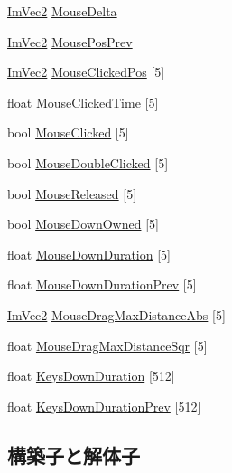 \begin{DoxyCompactItemize}
\item 
\mbox{\hyperlink{struct_im_vec2}{Im\+Vec2}} \mbox{\hyperlink{struct_im_gui_i_o_a5b5cc0c171104337e3e7e13a8f7b0938}{Mouse\+Delta}}
\item 
\mbox{\hyperlink{struct_im_vec2}{Im\+Vec2}} \mbox{\hyperlink{struct_im_gui_i_o_a0fa6601a709eb9e34460e6abc7e77ad7}{Mouse\+Pos\+Prev}}
\item 
\mbox{\hyperlink{struct_im_vec2}{Im\+Vec2}} \mbox{\hyperlink{struct_im_gui_i_o_a23c9c6c48a51774fee36b7f0bb75d331}{Mouse\+Clicked\+Pos}} \mbox{[}5\mbox{]}
\item 
float \mbox{\hyperlink{struct_im_gui_i_o_a729a9ddda54b9f7d7d640340d56e981b}{Mouse\+Clicked\+Time}} \mbox{[}5\mbox{]}
\item 
bool \mbox{\hyperlink{struct_im_gui_i_o_a8655587202ff9001e5b0ccc6ade42d93}{Mouse\+Clicked}} \mbox{[}5\mbox{]}
\item 
bool \mbox{\hyperlink{struct_im_gui_i_o_a8bc01048733dc554de3d03f40f57b9ca}{Mouse\+Double\+Clicked}} \mbox{[}5\mbox{]}
\item 
bool \mbox{\hyperlink{struct_im_gui_i_o_a3a2e7d52289eecfdbe8571e034e41b53}{Mouse\+Released}} \mbox{[}5\mbox{]}
\item 
bool \mbox{\hyperlink{struct_im_gui_i_o_a682f98d817f99058136cb47cf8a9bcc3}{Mouse\+Down\+Owned}} \mbox{[}5\mbox{]}
\item 
float \mbox{\hyperlink{struct_im_gui_i_o_ab464bf317051bbdf1c93ab36802fe3b7}{Mouse\+Down\+Duration}} \mbox{[}5\mbox{]}
\item 
float \mbox{\hyperlink{struct_im_gui_i_o_a59d19cf7ad831e57ce15f90295871881}{Mouse\+Down\+Duration\+Prev}} \mbox{[}5\mbox{]}
\item 
\mbox{\hyperlink{struct_im_vec2}{Im\+Vec2}} \mbox{\hyperlink{struct_im_gui_i_o_a402bca8838011fc4518c0895f24ffc92}{Mouse\+Drag\+Max\+Distance\+Abs}} \mbox{[}5\mbox{]}
\item 
float \mbox{\hyperlink{struct_im_gui_i_o_a86c7fe77349fd82a60ab7a279aa27f01}{Mouse\+Drag\+Max\+Distance\+Sqr}} \mbox{[}5\mbox{]}
\item 
float \mbox{\hyperlink{struct_im_gui_i_o_a6f1da2ea6d8e3398d9526fe983cf0a6f}{Keys\+Down\+Duration}} \mbox{[}512\mbox{]}
\item 
float \mbox{\hyperlink{struct_im_gui_i_o_ac079dcd415784a08fec74388e18abb97}{Keys\+Down\+Duration\+Prev}} \mbox{[}512\mbox{]}
\end{DoxyCompactItemize}


\subsection{構築子と解体子}
\mbox{\label{struct_im_gui_i_o_a0ad8d993e50108b81b0d279d2d43f69d}} 
